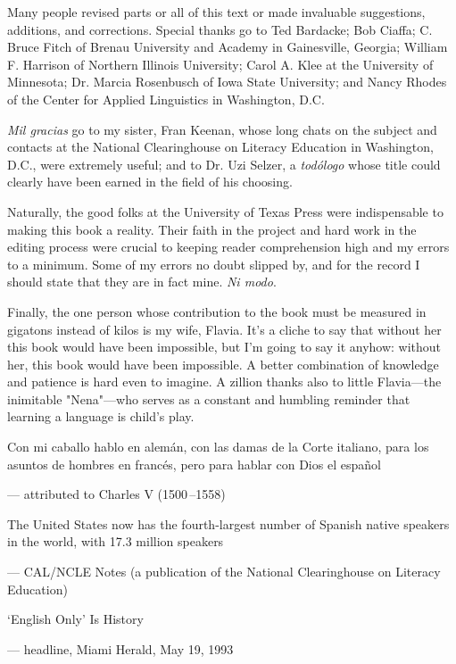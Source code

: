 Many people revised parts or all of this text or made invaluable suggestions, additions, and corrections. Special thanks go to
Ted Bardacke; Bob Ciaffa; C. Bruce Fitch of Brenau University and
Academy in Gainesville, Georgia; William F. Harrison of Northern
Illinois University; Carol A. Klee at the University of Minnesota;
Dr. Marcia Rosenbusch of Iowa State University; and Nancy Rhodes
of the Center for Applied Linguistics in Washington, D.C.

\emph{Mil gracias} go to my sister, Fran Keenan, whose long chats on
the subject and contacts at the National Clearinghouse on Literacy
Education in Washington, D.C., were extremely useful; and to Dr. Uzi
Selzer, a \emph{todólogo} whose title could clearly have been earned in the
field of his choosing.

Naturally, the good folks at the University of Texas Press were
indispensable to making this book a reality. Their faith in the project
and hard work in the editing process were crucial to keeping reader
comprehension high and my errors to a minimum. Some of my errors
no doubt slipped by, and for the record I should state that they are in
fact mine. \emph{Ni modo}.

Finally, the one person whose contribution to the book must
be measured in gigatons instead of kilos is my wife, Flavia. It's a cliche
to say that without her this book would have been impossible, but I'm
going to say it anyhow: without her, this book would have been impossible. A better combination of knowledge and patience is hard even to
imagine. A zillion thanks also to little Flavia---the inimitable "Nena"---who serves as a constant and humbling reminder that learning a language is child's play.

\pagebreak
\thispagestyle{empty}
\vspace*{2in}

\epigraphfontsize{\normalsize\itshape}
\setlength\epigraphwidth{5in}
\setlength\epigraphrule{0pt}

\epigraph{Con mi caballo hablo en alemán,
con las damas de la Corte italiano,
para los asuntos de hombres en francés,
pero para hablar con Dios el español}
{--- \textup{attributed
to Charles V (1500\,--1558)}}

\epigraph{The United States now has the fourth-largest
number of Spanish native speakers in the world,
with 17.3 million speakers}
{--- \textup{CAL/NCLE Notes
(a publication of the National Clearinghouse
on Literacy Education)}}

\epigraph{`English Only'
Is History}
{--- \textup{headline},
Miami Herald,
\textup{May 19, 1993}}

